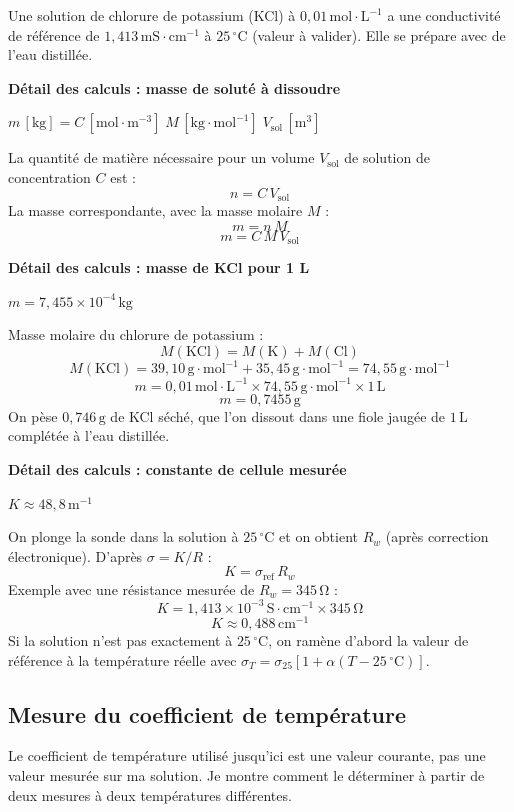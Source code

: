\documentclass[11pt,a4paper]{article}
\newcommand{\resultat}[1]{\begin{center}{\large\color{bleuENO}$\displaystyle #1$}\end{center}}
\newenvironment{demo}[2]{\par\medskip\noindent\textbf{Détail des calculs : #1}\par\nopagebreak\resultat{#2}}{\par\medskip}
\newcommand{\calcul}[2]{\par\medskip\noindent\textbf{Détail des calculs : #1}\par\nopagebreak\resultat{#2}}
\newcommand{\U}[1]{\,\mathrm{#1}}
\begin{document}
Une solution de chlorure de potassium (KCl) à $0{,}01\U{mol \cdot L^{-1}}$ a une conductivité de référence de $1{,}413\U{mS \cdot cm^{-1}}$ à $25\U{{}^{\circ}C}$ (valeur à valider). Elle se prépare avec de l'eau distillée.

\begin{demo}{masse de soluté à dissoudre}{m\,[\mathrm{kg}] = C\,[\mathrm{mol \cdot m^{-3}}] \; M\,[\mathrm{kg \cdot mol^{-1}}] \; V_{\text{sol}}\,[\mathrm{m^3}]}
La quantité de matière nécessaire pour un volume $V_{\text{sol}}$ de solution de concentration $C$ est :
\[
n = C \, V_{\text{sol}}
\]
La masse correspondante, avec la masse molaire $M$ :
\[
m = n \, M
\]
\[
m = C \, M \, V_{\text{sol}}
\]
\end{demo}

\calcul{masse de KCl pour 1 L}{m = 7{,}455 \times 10^{-4}\,\mathrm{kg}}
Masse molaire du chlorure de potassium :
\[
M(\mathrm{KCl}) = M(\mathrm{K}) + M(\mathrm{Cl})
\]
\[
M(\mathrm{KCl}) = 39{,}10\U{g \cdot mol^{-1}} + 35{,}45\U{g \cdot mol^{-1}} = 74{,}55\U{g \cdot mol^{-1}}
\]
\[
m = 0{,}01\U{mol \cdot L^{-1}} \times 74{,}55\U{g \cdot mol^{-1}} \times 1\U{L}
\]
\[
m = 0{,}7455\U{g}
\]
On pèse $0{,}746\U{g}$ de KCl séché, que l'on dissout dans une fiole jaugée de $1\U{L}$ complétée à l'eau distillée.

\calcul{constante de cellule mesurée}{K \approx 48{,}8\,\mathrm{m^{-1}}}
On plonge la sonde dans la solution à $25\U{{}^{\circ}C}$ et on obtient $R_w$ (après correction électronique). D'après $\sigma = K / R$ :
\[
K = \sigma_{\text{ref}} \, R_w
\]
Exemple avec une résistance mesurée de $R_w = 345\U{\Omega}$ :
\[
K = 1{,}413 \times 10^{-3}\U{S \cdot cm^{-1}} \times 345\U{\Omega}
\]
\[
K \approx 0{,}488\U{cm^{-1}}
\]
Si la solution n'est pas exactement à $25\U{{}^{\circ}C}$, on ramène d'abord la valeur de référence à la température réelle avec $\sigma_T = \sigma_{25} [1 + \alpha (T - 25\U{{}^{\circ}C})]$.

\subsection{Mesure du coefficient de température}

Le coefficient de température utilisé jusqu'ici est une valeur courante, pas une valeur mesurée sur ma solution. Je montre comment le déterminer à partir de deux mesures à deux températures différentes.
\end{document}
